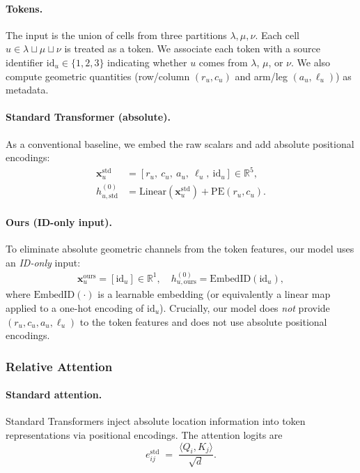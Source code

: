 \documentclass{article}
\theoremstyle{plain}
\theoremstyle{definition}
\theoremstyle{remark}
\begin{document}
\paragraph{Tokens.}
The input is the union of cells from three partitions $\lambda, \mu,\nu$.
Each cell $u\in \lambda\sqcup \mu\sqcup \nu$ is treated as a token. %
We associate each token with a source identifier $\mathrm{id}_u \in \{1,2,3\}$ indicating whether $u$ comes from $\lambda$, $\mu$, or $\nu$.
We also compute geometric quantities (row/column $(r_u,c_u)$ and arm/leg $(a_u,\ell_u)$) as metadata.

\paragraph{Standard Transformer (absolute).}
As a conventional baseline, we embed the raw scalars and add absolute positional encodings:
\begin{align*}
\mathbf{x}_u^{\mathrm{std}} &= [r_u,\ c_u,\ a_u,\ \ell_u,\ \mathrm{id}_u] \in \mathbb{R}^5, \\
h_{u,\mathrm{std}}^{(0)} &= \mathrm{Linear}(\mathbf{x}_u^{\mathrm{std}}) + \mathrm{PE}(r_u,c_u).
\end{align*}

\paragraph{Ours (ID-only input).}
To eliminate absolute geometric channels from the token features, our model uses an \emph{ID-only} input:
\begin{align*}
\mathbf{x}_u^{\mathrm{ours}} = [\mathrm{id}_u] \in \mathbb{R}^1,\quad 
h_{u,\mathrm{ours}}^{(0)} = \mathrm{EmbedID}(\mathrm{id}_u),
\end{align*}
where $\mathrm{EmbedID}(\cdot)$ is a learnable embedding (or equivalently a linear map applied to a one-hot encoding of $\mathrm{id}_u$).
Crucially, our model does \emph{not} provide $(r_u,c_u,a_u,\ell_u)$ to the token features and does not use absolute positional encodings.

\subsubsection{Relative Attention}

\paragraph{Standard attention.}
Standard Transformers inject absolute location information into token representations via positional encodings.
The attention logits are
\[
e^{\mathrm{std}}_{ij} \;=\; \frac{\langle Q_i, K_j\rangle}{\sqrt{d}}.
\]
\end{document}
